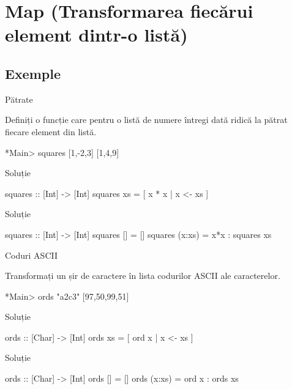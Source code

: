 \documentclass[xcolor=pdftex,romanian,colorlinks]{beamer}
\begin{document}
\section{Map (Transformarea fiecărui element dintr-o listă)}

\subsection{Exemple}

\begin{frame}[fragile]{Pătrate}
\begin{block}{}
Definiți o funcție care pentru o listă de numere întregi dată  ridică la pătrat fiecare element din listă.
\begin{asciihs}
*Main> squares [1,-2,3]
[1,4,9]
\end{asciihs}
\end{block}
\begin{block}{Soluție }
\begin{asciihs}
squares :: [Int] -> [Int]
squares xs = [ x * x | x <- xs ]
\end{asciihs}
\end{block}
\begin{block}{Soluție }
\begin{asciihs}
squares :: [Int] -> [Int]
squares []     = []
squares (x:xs) = x*x : squares xs
\end{asciihs}
\end{block}
\end{frame}

\begin{frame}[fragile]
{Coduri ASCII}
\begin{block}{}
Transformați un șir de caractere în lista codurilor ASCII ale caracterelor.
\begin{asciihs}
*Main> ords "a2c3"
[97,50,99,51]
\end{asciihs}
\end{block}
\begin{block}{Soluție }
\begin{asciihs}
ords :: [Char] -> [Int]
ords xs = [ ord x | x <- xs ]
\end{asciihs}
\end{block}
\begin{block}{Soluție }
\begin{asciihs}
ords :: [Char] -> [Int]
ords []     = []
ords (x:xs) = ord x : ords xs
\end{asciihs}
\end{block}
\end{frame}
\end{document}
